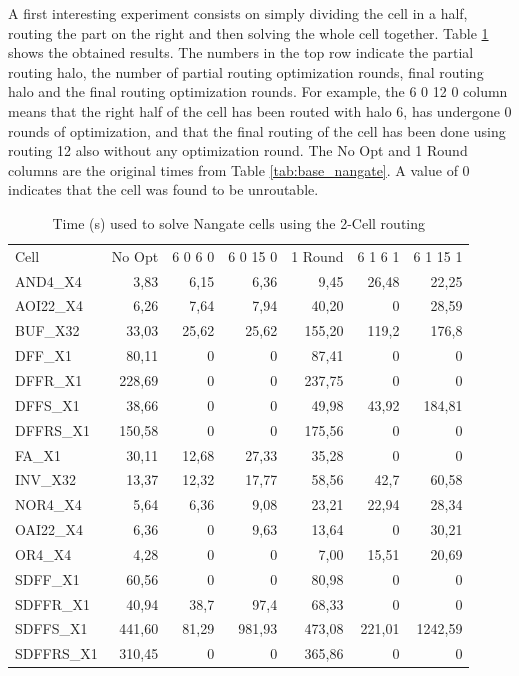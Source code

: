 A first interesting experiment consists on simply dividing the cell in a half, routing the part on the right and then solving the whole cell together. Table \ref{tab:ncell_nangate} shows the obtained results. The numbers in the top row indicate the partial routing halo, the number of partial routing optimization rounds, final routing halo and the final routing optimization rounds. For example, the 6 0 12 0 column means that the right half of the cell has been routed with halo 6, has undergone 0 rounds of optimization, and that the final routing of the cell has been done using routing 12 also without any optimization round. The No Opt and 1 Round columns are the original times from Table \ref{tab:base_nangate}. A value of 0 indicates that the cell was found to be unroutable. \\

\begin{table}
\centering
\begin{tabular}{|l|r|r|r|r|r|r|}
\cline{1-7}
Cell & No Opt & 6 0 6 0 & 6 0 15 0 & 1 Round & 6 1 6 1 & 6 1 15 1 \\ \cline{1-7}
AND4\_X4 & 3,83 & 6,15 & 6,36 & 9,45 & 26,48 & 22,25  \\ \hline
AOI22\_X4 & 6,26 & 7,64 & 7,94 & 40,20 & 0 & 28,59  \\ \hline
BUF\_X32 & 33,03 & 25,62 & 25,62 & 155,20 & 119,2 & 176,8  \\ \hline
DFF\_X1 & 80,11 & 0 & 0 & 87,41 & 0 & 0  \\ \hline
DFFR\_X1 & 228,69 & 0 & 0 & 237,75 & 0 & 0  \\ \hline
DFFS\_X1 & 38,66 & 0 & 0 & 49,98 & 43,92 & 184,81  \\ \hline
DFFRS\_X1 & 150,58 & 0 & 0 & 175,56 & 0 & 0  \\ \hline
FA\_X1 & 30,11 & 12,68 & 27,33 & 35,28 & 0 & 0  \\ \hline
INV\_X32 & 13,37 & 12,32 & 17,77 & 58,56 & 42,7 & 60,58  \\ \hline
NOR4\_X4 & 5,64 & 6,36 & 9,08 & 23,21 & 22,94 & 28,34  \\ \hline
OAI22\_X4 & 6,36 & 0 & 9,63 & 13,64 & 0 & 30,21  \\ \hline
OR4\_X4 & 4,28 & 0 & 0 & 7,00 & 15,51 & 20,69  \\ \hline
SDFF\_X1 & 60,56 & 0 & 0 & 80,98 & 0 & 0  \\ \hline 
SDFFR\_X1 & 40,94 & 38,7 & 97,4 & 68,33 & 0 & 0  \\ \hline 
SDFFS\_X1 & 441,60 & 81,29 & 981,93 & 473,08 & 221,01 & 1242,59  \\ \hline
SDFFRS\_X1 & 310,45 & 0 & 0 & 365,86 & 0 & 0  \\ \hline \cline{1-7}
\end{tabular} 
\caption{Time (s) used to solve Nangate cells using the 2-Cell routing}
\label{tab:ncell_nangate}
\end{table}

